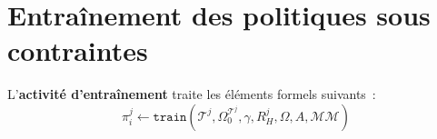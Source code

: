 \begin{enumerate*}[label=\arabic*),itemjoin={;\quad}]

\end{enumerate*}


\clearpage
\thispagestyle{empty}
\null
\newpage

\chapter{Entraînement des politiques sous contraintes}
\label{chap:training}

L'\textbf{activité d'entraînement} traite les éléments formels suivants~:
%
\begin{displaymath}
  \pi^j_i \gets \texttt{train}(\mathcal{T}^j, \Omega^{\mathcal{T}^j}_0, \gamma, R^j_H, \Omega, A, \mathcal{MM})
\end{displaymath}

